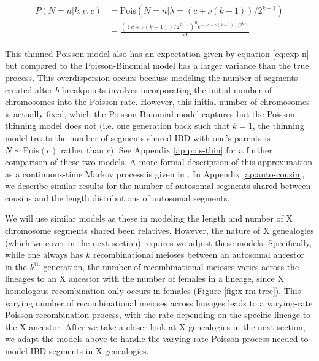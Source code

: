 \documentclass[11pt]{article}
\begin{document}
\begin{align}
\label{eq:auto-segment-number}
  P(N = n | k, \nu, c) &= \text{Pois}(N = n | \lambda = (c + \nu (k-1))/2^{k-1}) \nonumber \\
                       &= \frac{((c + \nu (k-1))/2^{k-1})^n  e^{- (c + \nu (k-1))/{2^{k - 1}}}}{n!}
\end{align}

This thinned Poisson model also has an expectation given by equation
\eqref{eq:exp-n} but compared to the Poisson-Binomial model has a larger
variance than the true process. This overdispersion occurs because modeling the
number of segments created after $b$ breakpoints involves incorporating the
initial number of chromosomes into the Poisson rate. However, this initial
number of chromosomes is actually fixed, which the Poisson-Binomial model
captures but the Poisson thinning model does not (i.e. one generation back such
that $k=1$, the thinning model treats the number of segments shared IBD with
one's parents is $N \sim \text{Pois}(c)$ rather than $c$). See Appendix
\ref{ap:pois-thin} for a further comparison of these two models. A more formal
description of this approximation as a continuous-time Markov process is given
in \textcite{thomas:1994hg}. In Appendix \ref{ap:auto-cousin}, we describe
similar results for the number of autosomal segments shared between cousins and
the length distributions of autosomal segments.

We will use similar models as these in modeling the length and number of X
chromosome segments shared been relatives. However, the nature of X genealogies
(which we cover in the next section) requires we adjust these models.
Specifically, while one always has $k$ recombinational meioses between an
autosomal ancestor in the $k^\text{th}$ generation, the number of
recombinational meioses varies across the lineages to an X ancestor with the
number of females in a lineage, since X homologous recombination only occurs in
females (Figure \ref{fig:x-rm-tree}). This varying number of recombinational
meioses across lineages leads to a varying-rate Poisson recombination process,
with the rate depending on the specific lineage to the X ancestor. After we
take a closer look at X genealogies in the next section, we adapt the models
above to handle the varying-rate Poisson process needed to model IBD segments
in X genealogies.
\end{document}
